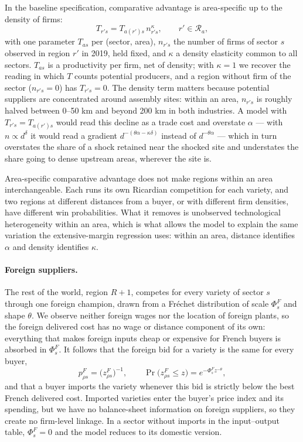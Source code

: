 In the baseline specification, comparative advantage is area-specific up to the density of firms:
\begin{equation}
T_{r's}=T_{a(r')s}\,n_{r's}^{\kappa}, \qquad r'\in\mathcal{R}_{a},
\label{eq:app-density}
\end{equation}
with one parameter $T_{as}$ per (sector, area), $n_{r's}$ the number of firms of sector $s$ observed in region $r'$ in 2019, held fixed, and $\kappa$ a density elasticity common to all sectors. $T_{as}$ is a productivity per firm, net of density; with $\kappa=1$ we recover the \cite{EatonKortum2002} reading in which $T$ counts potential producers, and a region without firm of the sector ($n_{r's}=0$) has $T_{r's}=0$. The density term matters because potential suppliers are concentrated around assembly sites: within an area, $n_{r's}$ is roughly halved between 0--50 km and beyond 200 km in both industries. A model with $T_{r's}=T_{a(r')s}$ would read this decline as a trade cost and overstate $\alpha$ --- with $n\propto d^{\delta}$ it would read a gradient $d^{-(\theta\alpha-\kappa\delta)}$ instead of $d^{-\theta\alpha}$ --- which in turn overstates the share of a shock retained near the shocked site and understates the share going to dense upstream areas, wherever the site is.

Area-specific comparative advantage does not make regions within an area interchangeable. Each runs its own Ricardian competition for each variety, and two regions at different distances from a buyer, or with different firm densities, have different win probabilities. What it removes is unobserved technological heterogeneity within an area, which is what allows the model to explain the same variation the extensive-margin regression uses: within an area, distance identifies $\alpha$ and density identifies $\kappa$.

\paragraph{Foreign suppliers.}\label{app:model-foreign-setup} The rest of the world, region $R+1$, competes for every variety of sector $s$ through one foreign champion, drawn from a Fréchet distribution of scale $\Phi^F_s$ and shape $\theta$. We observe neither foreign wages nor the location of foreign plants, so the foreign delivered cost has no wage or distance component of its own: everything that makes foreign inputs cheap or expensive for French buyers is absorbed in $\Phi^F_s$. It follows that the foreign bid for a variety is the same for every buyer,
\begin{equation}
p^F_{\rho s}=\big(z^F_{\rho s}\big)^{-1},\qquad \Pr\big(z^F_{\rho s}\le z\big)=e^{-\Phi^F_sz^{-\theta}},
\label{eq:app-foreign-bid}
\end{equation}
and that a buyer imports the variety whenever this bid is strictly below the best French delivered cost. Imported varieties enter the buyer's price index and its spending, but we have no balance-sheet information on foreign suppliers, so they create no firm-level linkage. In a sector without imports in the input--output table, $\Phi^F_s=0$ and the model reduces to its domestic version.


